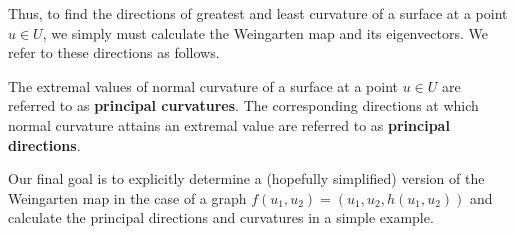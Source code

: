        	Thus, to find the directions of greatest and least curvature of a surface at a point $u \in U$, we simply must calculate the Weingarten map and its eigenvectors. We refer to these directions as follows.
       	
       	\begin{defn}
       		The extremal values of normal curvature of a surface at a point  $u\in U$
       		are referred to as \textbf{principal curvatures}. The corresponding directions at which normal curvature attains an extremal value are referred to as \textbf{principal directions}.
       	\end{defn}
       	
       	Our final goal is to explicitly determine a (hopefully simplified) version of the Weingarten map in the case of a graph $f(u_1,u_2) = (u_1,u_2, h(u_1,u_2))$ and calculate
       	the principal directions and curvatures in a simple example.
       	        		
